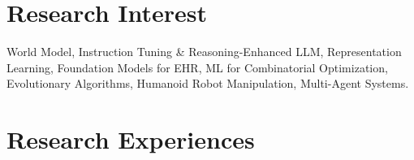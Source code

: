 \documentclass[a4paper,11pt]{article}
\begin{document}
\vspace{-3mm}
\section{\textbf{Research Interest}}
\noindent
\small{World Model, Instruction Tuning \& Reasoning-Enhanced LLM, Representation Learning, Foundation Models for EHR, ML for Combinatorial Optimization, Evolutionary Algorithms, Humanoid Robot Manipulation, Multi-Agent Systems.}

\vspace{-1mm}
\section{\textbf{Research Experiences}}
\end{document}
